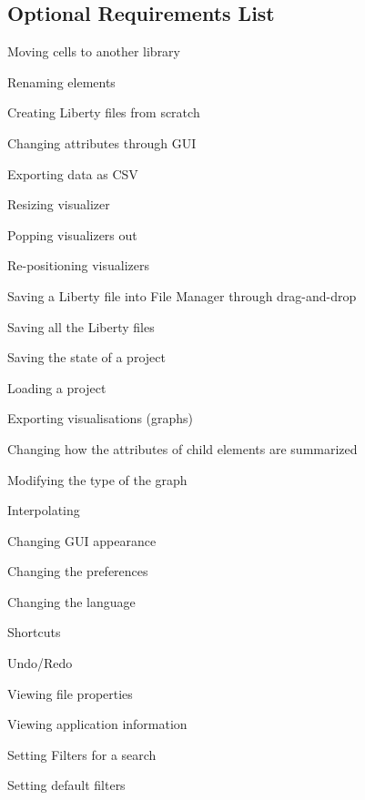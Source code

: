 \documentclass[10pt,a4paper]{report}
\begin{document}
\subsection{Optional Requirements List}

\begin{FRO}
    \item Moving cells to another library \label{FRO-1}
    \item Renaming elements \label{FRO-2}
    \item Creating Liberty files from scratch \label{FRO-3}
    \item Changing attributes through GUI \label{FRO-4}
    \item Exporting data as CSV \label{FRO-5}
    \item Resizing visualizer \label{FRO-6}
    \item Popping visualizers out \label{FRO-7}
    \item Re-positioning visualizers \label{FRO-8}
    \item Saving a Liberty file into File Manager through drag-and-drop \label{FRO-9}
    \item Saving all the Liberty files \label{FRO-10} %
    \item Saving the state of a project \label{FRO-11}
    \item Loading a project \label{FRO-12}
    \item Exporting visualisations (graphs) \label{FRO-13}
    \item Changing how the attributes of child elements are summarized \label{FRO-14}
    \item Modifying the type of the graph \label{FRO-15}
    \item Interpolating \label{FRO-16}
    \item Changing GUI appearance \label{FRO-17}
    \item Changing the preferences \label{FRO-18}
    \item Changing the language \label{FRO-19}
    \item Shortcuts \label{FRO-20}
    \item Undo/Redo \label{FRO-21}
    \item Viewing file properties \label{FRO-22}
    \item Viewing application information \label{FRO-23} %
    \item Setting Filters for a search \label{FRO-24}
    \item Setting default filters\label{FRO-25}
\end{FRO}
\end{document}
